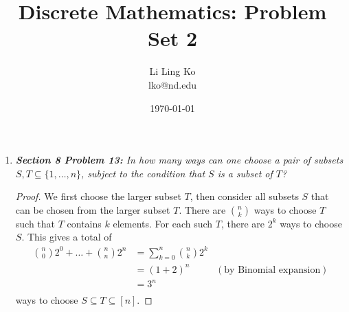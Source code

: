 \documentclass{article}
\begin{document}
\title{Discrete Mathematics: Problem Set 2}
\author{Li Ling Ko\\ lko@nd.edu}
\date{\today}
\maketitle

\begin{enumerate}[label={\bf Q\arabic*:}]
  \item \it \textbf{Section 8 Problem 13:} In how many ways can one choose
    a pair of subsets $S,T\subseteq\{1,\ldots,n\}$, subject to the
    condition that $S$ is a subset of $T$?

    \begin{proof}
      We first choose the larger subset $T$, then consider all subsets $S$
      that can be chosen from the larger subset $T$. There are
      $\binom{n}{k}$ ways to choose $T$ such that $T$ contains $k$
      elements. For each such $T$, there are $2^k$ ways to choose $S$. This
      gives a total of
      \begin{align*}
        \binom{n}{0}2^0+\ldots+\binom{n}{n}2^n
          &=\sum_{k=0}^n\binom{n}{k}2^k\\
          &=(1+2)^n &(\text{by Binomial expansion})\\
          &=3^n\\
      \end{align*}
      ways to choose $S\subseteq T\subseteq[n]$.
    \end{proof}
\end{enumerate}
\end{document}
